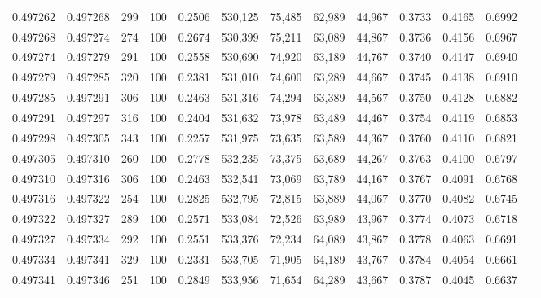 \begin{tabular}{rrrrrrrrrrrrr}
0.497262 & 0.497268 &   299 & 100 &                                     0.2506 & 530,125 &  75,485 &  62,989 &  44,967 & 0.3733 & 0.4165 & 0.6992 \\
0.497268 & 0.497274 &   274 & 100 &                                     0.2674 & 530,399 &  75,211 &  63,089 &  44,867 & 0.3736 & 0.4156 & 0.6967 \\
0.497274 & 0.497279 &   291 & 100 &                                     0.2558 & 530,690 &  74,920 &  63,189 &  44,767 & 0.3740 & 0.4147 & 0.6940 \\
0.497279 & 0.497285 &   320 & 100 &                                     0.2381 & 531,010 &  74,600 &  63,289 &  44,667 & 0.3745 & 0.4138 & 0.6910 \\
0.497285 & 0.497291 &   306 & 100 &                                     0.2463 & 531,316 &  74,294 &  63,389 &  44,567 & 0.3750 & 0.4128 & 0.6882 \\
0.497291 & 0.497297 &   316 & 100 &                                     0.2404 & 531,632 &  73,978 &  63,489 &  44,467 & 0.3754 & 0.4119 & 0.6853 \\
0.497298 & 0.497305 &   343 & 100 &                                     0.2257 & 531,975 &  73,635 &  63,589 &  44,367 & 0.3760 & 0.4110 & 0.6821 \\
0.497305 & 0.497310 &   260 & 100 &                                     0.2778 & 532,235 &  73,375 &  63,689 &  44,267 & 0.3763 & 0.4100 & 0.6797 \\
0.497310 & 0.497316 &   306 & 100 &                                     0.2463 & 532,541 &  73,069 &  63,789 &  44,167 & 0.3767 & 0.4091 & 0.6768 \\
0.497316 & 0.497322 &   254 & 100 &                                     0.2825 & 532,795 &  72,815 &  63,889 &  44,067 & 0.3770 & 0.4082 & 0.6745 \\
0.497322 & 0.497327 &   289 & 100 &                                     0.2571 & 533,084 &  72,526 &  63,989 &  43,967 & 0.3774 & 0.4073 & 0.6718 \\
0.497327 & 0.497334 &   292 & 100 &                                     0.2551 & 533,376 &  72,234 &  64,089 &  43,867 & 0.3778 & 0.4063 & 0.6691 \\
0.497334 & 0.497341 &   329 & 100 &                                     0.2331 & 533,705 &  71,905 &  64,189 &  43,767 & 0.3784 & 0.4054 & 0.6661 \\
0.497341 & 0.497346 &   251 & 100 &                                     0.2849 & 533,956 &  71,654 &  64,289 &  43,667 & 0.3787 & 0.4045 & 0.6637 \\

\end{tabular}

